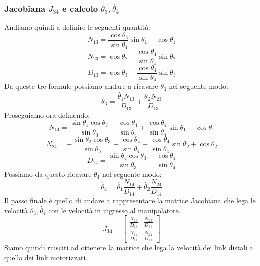 \subsubsection{Jacobiana $J_{34}$ e calcolo $\dot{\theta_3},\dot{\theta_4}$}
Andiamo quindi a definire le seguenti quantità:
\begin{equation*}
    N_{13} = \frac{\cos\theta_4}{\sin\theta_4}\sin\theta_1-\cos\theta_1
\end{equation*}
\begin{equation*}
    N_{23} = \cos\theta_2-\frac{\cos\theta_4}{\sin\theta_4}\sin\theta_2
\end{equation*}
\begin{equation*}
    D_{13} = \cos\theta_3-\frac{\cos\theta_4}{\sin\theta_4}\sin\theta_3
\end{equation*}
Da queste tre formule possiamo andare a ricavare $\dot{\theta_3}$ nel seguente modo:
\begin{equation}
    \dot{\theta_3} = \frac{\dot{\theta_1}N_{13}}{D_{13}}+\frac{\dot{\theta_2}N_{23}}{D_{13}}
\end{equation}
Proseguiamo ora definendo:
\begin{equation*}
    N_{14} = \frac{\sin\theta_1\cos\theta_3}{\sin\theta_3}-\frac{\cos\theta_4}{\sin\theta_4}+\frac{\cos\theta_4}{\sin\theta_4}\sin\theta_1 - \cos\theta_1
\end{equation*}
\begin{equation*}
    N_{24} = -\frac{\sin\theta_2\cos\theta_3}{\sin\theta_3}-\frac{\cos\theta_4}{\sin\theta_4}-\frac{\cos\theta_4}{\sin\theta_4}\sin\theta_2+\cos\theta_2
\end{equation*}
\begin{equation*}
    D_{14} = \frac{\sin\theta_4\cos\theta_3}{\sin\theta_3}-\frac{\cos\theta_4}{\sin\theta_4}
\end{equation*}
Possiamo da questo ricavare $\dot{\theta_4}$ nel seguente modo:
\begin{equation}
    \dot{\theta_4} = \dot{\theta_1}\frac{N_{14}}{D_{14}}+\dot{\theta_2}\frac{N_{24}}{D_{14}}
\end{equation}
Il passo finale è quello di andare a rappresentare la matrice Jacobiana che lega le velocità $\dot{\theta_3}, \dot{\theta_4}$ con le velocità in ingresso al manipolatore.
\begin{equation}
    J_{34} = \begin{bmatrix}
    \frac{N_{13}}{D_{13}} & \frac{N_{23}}{D_{13}} \\
    \frac{N_{14}}{D_{14}} & \frac{N_{24}}{D_{14}}
    \end{bmatrix}
\end{equation}
Siamo quindi riusciti ad ottenere la matrice che lega la velocità dei link distali a quella dei link motorizzati.
